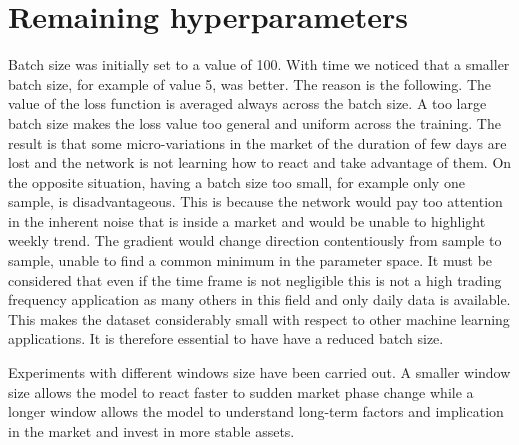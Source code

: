 \section{Remaining hyperparameters}
\label{s:remaining_hyperparameters}

Batch size was initially set to a value of 100. With time we noticed that a smaller batch size, for example of value 5, was better. The reason is the following. The value of the loss function is averaged always across the batch size. A too large batch size makes the loss value too general and uniform across the training. The result is that some micro-variations in the market of the duration of few days are lost and the network is not learning how to react and take advantage of them. On the opposite situation, having a batch size too small, for example only one sample, is disadvantageous. This is because the network would pay too attention in the inherent noise that is inside a market and would be unable to highlight weekly trend. The gradient would change direction contentiously from sample to sample, unable to find a common minimum in the parameter space.
 It must be considered that even if the time frame is not negligible this is not a high trading frequency application as many others in this field and only daily data is available. This makes the dataset considerably small with respect to other machine learning applications. It is therefore essential to have have a reduced batch size.

\hfill \break

Experiments with different windows size have been carried out. A smaller window size allows the model to react faster to sudden market phase change while a longer window allows the model to understand long-term factors and implication in the market and invest in more stable assets.







